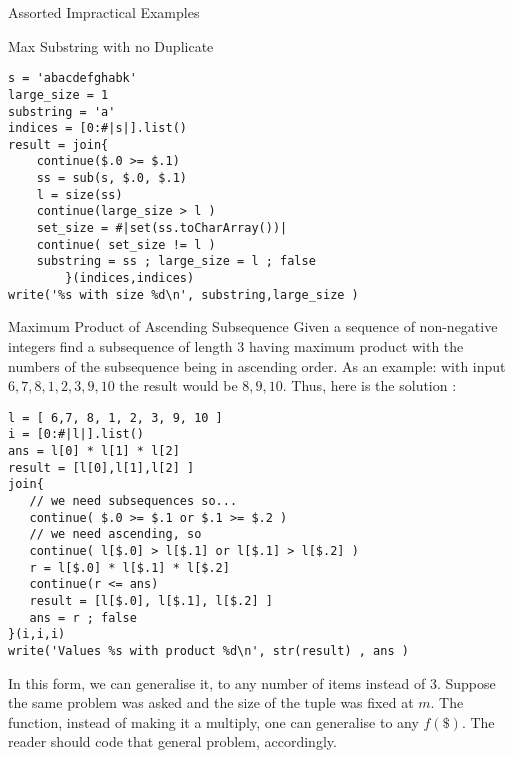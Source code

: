 \begin{section}{Assorted Impractical Examples}
\begin{subsection}{Max Substring with no Duplicate}
\begin{center}\begin{minipage}{\linewidth}
\begin{lstlisting}[style=JexlStyle]
s = 'abacdefghabk'
large_size = 1
substring = 'a'
indices = [0:#|s|].list()
result = join{
    continue($.0 >= $.1)
    ss = sub(s, $.0, $.1)
    l = size(ss)
    continue(large_size > l )
    set_size = #|set(ss.toCharArray())| 
    continue( set_size != l )
    substring = ss ; large_size = l ; false 
        }(indices,indices) 
write('%s with size %d\n', substring,large_size )
\end{lstlisting}  
\end{minipage}\end{center}
\end{subsection}

\begin{subsection}{Maximum Product of Ascending Subsequence}
Given a sequence of non-negative integers find a subsequence of length 3 
having maximum product with the numbers of the subsequence being in ascending order. 
As an example: with input  $6,7, 8, 1, 2, 3, 9, 10$  the result would be $8, 9, 10$.
Thus, here is the solution :

\begin{center}\begin{minipage}{\linewidth}
\begin{lstlisting}[style=JexlStyle]
l = [ 6,7, 8, 1, 2, 3, 9, 10 ]
i = [0:#|l|].list()
ans = l[0] * l[1] * l[2]
result = [l[0],l[1],l[2] ]
join{
   // we need subsequences so...
   continue( $.0 >= $.1 or $.1 >= $.2 )
   // we need ascending, so 
   continue( l[$.0] > l[$.1] or l[$.1] > l[$.2] )
   r = l[$.0] * l[$.1] * l[$.2]
   continue(r <= ans)
   result = [l[$.0], l[$.1], l[$.2] ] 
   ans = r ; false  
}(i,i,i)
write('Values %s with product %d\n', str(result) , ans )
\end{lstlisting}  
\end{minipage}\end{center}

In this form, we can generalise it, to any number of items instead of 3.
Suppose the same problem was asked and the size of the tuple was fixed at $m$.
The function, instead of making it a multiply, one can generalise to any $f(\$)$.
The reader should code that general problem, accordingly.

\end{subsection}


\end{section}
